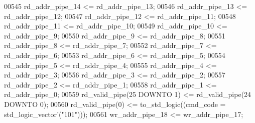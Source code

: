 \begin{DoxyCode}
00545         \textcolor{vhdlchar}{rd_addr_pipe_14} \textcolor{vhdlchar}{<=} \textcolor{vhdlchar}{rd_addr_pipe_13};
00546         \textcolor{vhdlchar}{rd_addr_pipe_13} \textcolor{vhdlchar}{<=} \textcolor{vhdlchar}{rd_addr_pipe_12};
00547         \textcolor{vhdlchar}{rd_addr_pipe_12} \textcolor{vhdlchar}{<=} \textcolor{vhdlchar}{rd_addr_pipe_11};
00548         \textcolor{vhdlchar}{rd_addr_pipe_11} \textcolor{vhdlchar}{<=} \textcolor{vhdlchar}{rd_addr_pipe_10};
00549         \textcolor{vhdlchar}{rd_addr_pipe_10} \textcolor{vhdlchar}{<=} \textcolor{vhdlchar}{rd_addr_pipe_9};
00550         \textcolor{vhdlchar}{rd_addr_pipe_9} \textcolor{vhdlchar}{<=} \textcolor{vhdlchar}{rd_addr_pipe_8};
00551         \textcolor{vhdlchar}{rd_addr_pipe_8} \textcolor{vhdlchar}{<=} \textcolor{vhdlchar}{rd_addr_pipe_7};
00552         \textcolor{vhdlchar}{rd_addr_pipe_7} \textcolor{vhdlchar}{<=} \textcolor{vhdlchar}{rd_addr_pipe_6};
00553         \textcolor{vhdlchar}{rd_addr_pipe_6} \textcolor{vhdlchar}{<=} \textcolor{vhdlchar}{rd_addr_pipe_5};
00554         \textcolor{vhdlchar}{rd_addr_pipe_5} \textcolor{vhdlchar}{<=} \textcolor{vhdlchar}{rd_addr_pipe_4};
00555         \textcolor{vhdlchar}{rd_addr_pipe_4} \textcolor{vhdlchar}{<=} \textcolor{vhdlchar}{rd_addr_pipe_3};
00556         \textcolor{vhdlchar}{rd_addr_pipe_3} \textcolor{vhdlchar}{<=} \textcolor{vhdlchar}{rd_addr_pipe_2};
00557         \textcolor{vhdlchar}{rd_addr_pipe_2} \textcolor{vhdlchar}{<=} \textcolor{vhdlchar}{rd_addr_pipe_1};
00558         \textcolor{vhdlchar}{rd_addr_pipe_1} \textcolor{vhdlchar}{<=} \textcolor{vhdlchar}{rd_addr_pipe_0};
00559         \textcolor{vhdlchar}{rd_valid_pipe}\textcolor{vhdlchar}{(}\textcolor{vhdllogic}{}\textcolor{vhdllogic}{25} \textcolor{keywordflow}{DOWNTO} \textcolor{vhdllogic}{}\textcolor{vhdllogic}{1}\textcolor{vhdlchar}{)} \textcolor{vhdlchar}{<=} \textcolor{vhdlchar}{rd_valid_pipe}\textcolor{vhdlchar}{(}\textcolor{vhdllogic}{}\textcolor{vhdllogic}{24} \textcolor{keywordflow}{DOWNTO} \textcolor{vhdllogic}{}\textcolor{vhdllogic}{0}\textcolor{vhdlchar}{)};
00560         \textcolor{vhdlchar}{rd_valid_pipe}\textcolor{vhdlchar}{(}\textcolor{vhdllogic}{}\textcolor{vhdllogic}{0}\textcolor{vhdlchar}{)} \textcolor{vhdlchar}{<=} \textcolor{vhdlchar}{to\_std\_logic}\textcolor{vhdlchar}{(}\textcolor{vhdlchar}{(}\textcolor{vhdlchar}{cmd_code} \textcolor{vhdlchar}{=} \textcolor{comment}{std\_logic\_vector}\textcolor{vhdlchar}{'}\textcolor{vhdlchar}{(}\textcolor{vhdllogic}{"101"}\textcolor{vhdlchar}{)}\textcolor{vhdlchar}{)}\textcolor{vhdlchar}{)};
00561         \textcolor{vhdlchar}{wr_addr_pipe_18} \textcolor{vhdlchar}{<=} \textcolor{vhdlchar}{wr_addr_pipe_17};

\end{DoxyCode}
